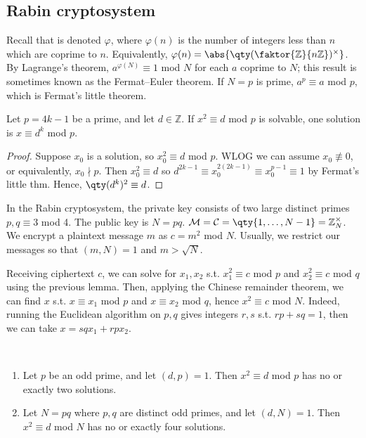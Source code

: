 \subsection{Rabin cryptosystem}
Recall that  is denoted $\varphi$, where $\varphi(n)$ is the number of integers less than $n$ which are coprime to $n$.
Equivalently, $\varphi(n) = \abs{\qty(\faktor{\mathbb Z}{n\mathbb Z})^\times}$.
By Lagrange's theorem, $a^{\varphi(N)} \equiv 1$ mod $N$ for each $a$ coprime to $N$; this result is sometimes known as the Fermat--Euler theorem.
If $N = p$ is prime, $a^p \equiv a$ mod $p$, which is Fermat's little theorem.

\begin{lemma}
    Let $p = 4k - 1$ be a prime, and let $d \in \mathbb Z$.
    If $x^2 \equiv d$ mod $p$ is solvable, one solution is $x \equiv d^k$ mod $p$.
\end{lemma}

\begin{proof}
    Suppose $x_0$ is a solution, so $x_0^2 \equiv d$ mod $p$.
    WLOG we can assume $x_0 \not\equiv 0$, or equivalently, $x_0 \nmid p$.
    Then $x_0^2 \equiv d$ so $d^{2k-1} \equiv x_0^{2(2k-1)} \equiv x_0^{p-1} \equiv 1$ by Fermat's little thm.
    Hence, $\qty(d^k)^2 \equiv d$.
\end{proof}

In the Rabin cryptosystem, the private key consists of two large distinct primes $p, q \equiv 3$ mod 4.
The public key is $N = pq$.
$\mathcal M = \mathcal C = \qty{1, \dots, N-1} = \mathbb Z_N^\times$.
We encrypt a plaintext message $m$ as $c = m^2$ mod $N$.
Usually, we restrict our messages so that $(m, N) = 1$ and $m > \sqrt{N}$.

Receiving ciphertext $c$, we can solve for $x_1, x_2$ s.t. $x_1^2 \equiv c$ mod $p$ and $x_2^2 \equiv c$ mod $q$ using the previous lemma.
Then, applying the Chinese remainder theorem, we can find $x$ s.t. $x \equiv x_1$ mod $p$ and $x \equiv x_2$ mod $q$, hence $x^2 \equiv c$ mod $N$.
Indeed, running the Euclidean algorithm on $p, q$ gives integers $r, s$ s.t. $rp + sq = 1$, then we can take $x = sqx_1 + rpx_2$.

\begin{lemma} ~\vspace*{-1.5\baselineskip}
    \begin{enumerate}
        \item Let $p$ be an odd prime, and let $(d, p) = 1$.
        Then $x^2 \equiv d$ mod $p$ has no or exactly two solutions.
        \item Let $N = pq$ where $p, q$ are distinct odd primes, and let $(d, N) = 1$.
        Then $x^2 \equiv d$ mod $N$ has no or exactly four solutions.
    \end{enumerate}
\end{lemma}

